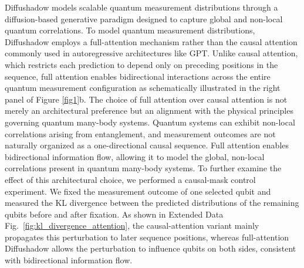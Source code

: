 \documentclass[pdflatex,sn-mathphys-num]{sn-jnl}%
\theoremstyle{thmstyleone}%
\theoremstyle{thmstyletwo}%
\theoremstyle{thmstylethree}%
\begin{document}
Diffushadow models scalable quantum measurement distributions through a diffusion-based generative paradigm designed to capture global and non-local quantum correlations. To model quantum measurement distributions, Diffushadow employs a full-attention mechanism rather than the causal attention commonly used in autoregressive architectures like GPT. Unlike causal attention, which restricts each prediction to depend only on preceding positions in the sequence, full attention enables bidirectional interactions across the entire quantum measurement configuration as schematically illustrated in the right panel of Figure \ref{fig1}b. The choice of full attention over causal attention is not merely an architectural preference but an alignment with the physical principles governing quantum many-body systems. Quantum systems can exhibit non-local correlations arising from entanglement, and measurement outcomes are not naturally organized as a one-directional causal sequence. 
Full attention enables bidirectional information flow, allowing it to model the global, non-local correlations present in quantum many-body systems. 
To further examine the effect of this architectural choice, we performed a causal-mask control experiment. We fixed the measurement outcome of one selected qubit and measured the KL divergence between the predicted distributions of the remaining qubits before and after fixation. As shown in Extended Data Fig.~\ref{fig:kl_divergence_attention}, the causal-attention variant mainly propagates this perturbation to later sequence positions, whereas full-attention Diffushadow allows the perturbation to influence qubits on both sides, consistent with bidirectional information flow.
\end{document}
